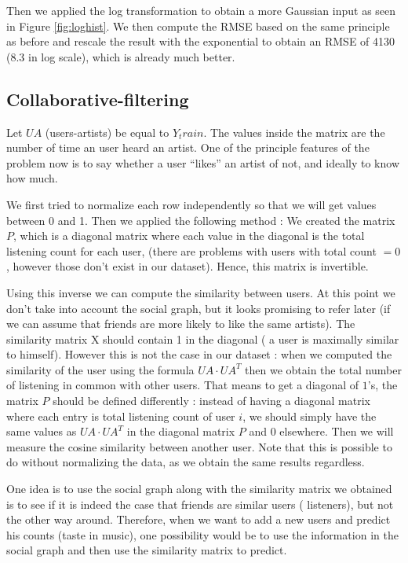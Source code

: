 \documentclass{article} %
\begin{document}
Then we applied the log transformation to obtain a more Gaussian input as seen in Figure \ref{fig:loghist}. We then compute the RMSE based on the same principle as before and rescale the result with the exponential to obtain an RMSE of 4130 (8.3 in log scale), which is already much better.

\subsection{Collaborative-filtering}
Let $UA$ (users-artists) be equal to $Y_train$. The values inside the matrix are the number of time an user heard an artist. One of the principle features of the problem now is to say whether a user “likes” an artist of not, and ideally to know how much.

We first tried to normalize each row independently so that we will get values between 0 and 1.  Then we applied the following method : We created the matrix $P$, which is a diagonal matrix where each value in the diagonal is the total listening count for each user, (there are problems with users with total count $= 0$, however those don’t exist in our dataset). Hence, this matrix is invertible.

Using this inverse we can compute the similarity between users. At this point we don’t take into account the social graph, but it looks promising to refer later (if we can assume that friends are more likely to like the same artists). The similarity matrix X should contain 1 in the diagonal ( a user is maximally similar to himself). However this is not the case in our dataset : when we computed the similarity of the user using the formula $UA\cdot UA^T$ then we obtain the total number of listening in common with other users. That means to get a diagonal of $1$’s, the matrix $P$ should be defined differently : instead of having a diagonal matrix where each entry is  total listening count of user $i$, we should simply have the same values as $UA \cdot UA^T$ in the diagonal matrix $P$ and $0$ elsewhere. Then we will measure the cosine similarity between another user. Note that this is possible to do without normalizing the data, as we obtain the same results regardless.

One idea is to use the social graph along with the similarity matrix we obtained is to see if it is indeed the case that friends are similar users ( listeners), but not the other way around. Therefore, when we want to add a new users and predict his counts (taste in music), one possibility would be to use the information in the social graph and then use the similarity matrix to predict.
\end{document}
